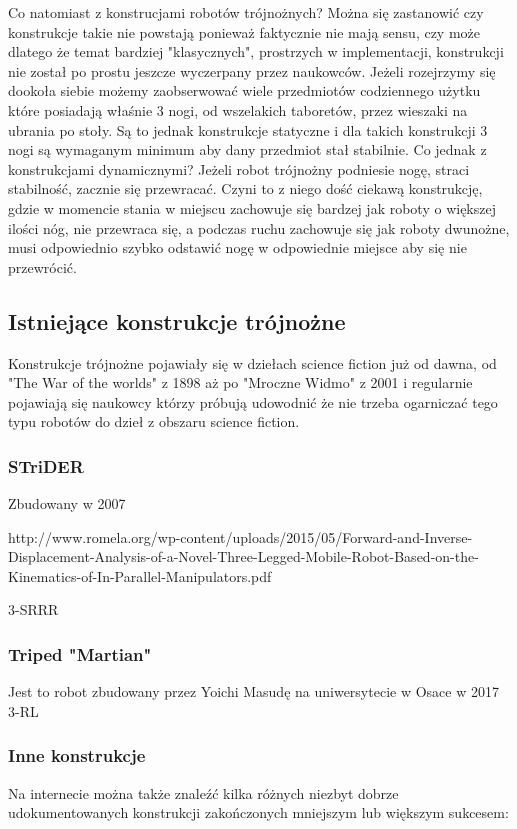 \documentclass[a4paper,13pt]{article}
\begin{document}
Co natomiast z konstrucjami robotów trójnożnych? Można się zastanowić czy konstrukcje takie nie powstają ponieważ faktycznie nie mają sensu, czy może dlatego że temat bardziej "klasycznych", prostrzych w implementacji, konstrukcji nie został po prostu jeszcze wyczerpany przez naukowców. Jeżeli rozejrzymy się dookoła siebie możemy zaobserwować wiele przedmiotów codziennego użytku które posiadają właśnie 3 nogi, od wszelakich taboretów, przez wieszaki na ubrania po stoły. Są to jednak konstrukcje statyczne i dla takich konstrukcji 3 nogi są wymaganym minimum aby dany przedmiot stał stabilnie. Co jednak z konstrukcjami dynamicznymi? Jeżeli robot trójnożny podniesie nogę, straci stabilność, zacznie się przewracać. Czyni to z niego dość ciekawą konstrukcję, gdzie w momencie stania w miejscu zachowuje się bardzej jak roboty o większej ilości nóg, nie przewraca się, a podczas ruchu zachowuje się jak roboty dwunożne, musi odpowiednio szybko odstawić nogę w odpowiednie miejsce aby się nie przewrócić.\\

\subsection{Istniejące konstrukcje trójnożne}
Konstrukcje trójnożne pojawiały się w dziełach science fiction już od dawna, od "The War of the worlds" z 1898 aż po "Mroczne Widmo" z 2001 i regularnie pojawiają się naukowcy którzy próbują udowodnić że nie trzeba ogarniczać tego typu robotów do dzieł z obszaru science fiction.
\subsubsection{STriDER}
Zbudowany w 2007

http://www.romela.org/wp-content/uploads/2015/05/Forward-and-Inverse-Displacement-Analysis-of-a-Novel-Three-Legged-Mobile-Robot-Based-on-the-Kinematics-of-In-Parallel-Manipulators.pdf

3-SRRR

\subsubsection{Triped "Martian"}
Jest to robot zbudowany przez Yoichi Masudę na uniwersytecie w Osace w 2017
3-RL

\subsubsection{Inne konstrukcje}
Na internecie można także znaleźć kilka różnych niezbyt dobrze udokumentowanych konstrukcji zakończonych mniejszym lub większym sukcesem:
\end{document}
